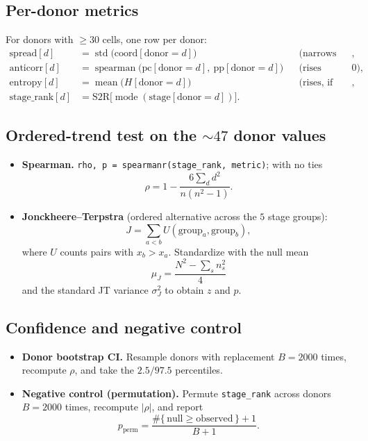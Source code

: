 \documentclass[11pt]{article}
\newcommand{\code}[1]{\texttt{\small #1}}
\newcommand{\coordc}{\mathrm{coord}}
\begin{document}
\subsection{Per-donor metrics}
For donors with $\ge 30$ cells, one row per donor:
\begin{align}
  \text{spread}[d]     &= \operatorname{std}\big(\coordc[\text{donor}=d]\big)
                          && \text{(narrows with disease)}, \\
  \text{anticorr}[d]   &= \operatorname{spearman}\big(\text{pc}[\text{donor}=d],\ \text{pp}[\text{donor}=d]\big)
                          && \text{(rises toward } 0), \\
  \text{entropy}[d]    &= \operatorname{mean}\big(H[\text{donor}=d]\big)
                          && \text{(rises, if classifier run)}, \\
  \text{stage\_rank}[d] &= \text{S2R}\big[\operatorname{mode}(\text{stage}[\text{donor}=d])\big].
\end{align}

\subsection{Ordered-trend test on the $\sim\!47$ donor values}
\begin{itemize}[leftmargin=1.4em]
  \item \textbf{Spearman.} \code{rho, p = spearmanr(stage\_rank, metric)}; with no ties
        \[
          \rho = 1 - \frac{6\sum_d d^2}{n(n^2-1)}.
        \]
  \item \textbf{Jonckheere--Terpstra} (ordered alternative across the $5$ stage groups):
        \[
          J = \sum_{a<b} U(\text{group}_a, \text{group}_b),
        \]
        where $U$ counts pairs with $x_b > x_a$. Standardize with the null mean
        \[
          \mu_J = \frac{N^2 - \sum_s n_s^2}{4}
        \]
        and the standard JT variance $\sigma_J^2$ to obtain $z$ and $p$.
\end{itemize}

\subsection{Confidence and negative control}
\begin{itemize}[leftmargin=1.4em]
  \item \textbf{Donor bootstrap CI.} Resample donors with replacement $B = 2000$ times, recompute
        $\rho$, and take the $2.5 / 97.5$ percentiles.
  \item \textbf{Negative control (permutation).} Permute \code{stage\_rank} across donors $B = 2000$
        times, recompute $|\rho|$, and report
        \[
          p_{\text{perm}} = \frac{\#\{\,\text{null} \ge \text{observed}\,\} + 1}{B + 1}.
        \]
\end{itemize}
\end{document}
